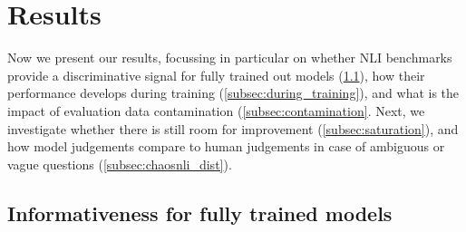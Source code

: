 \section{Results}

Now we present our results, focussing in particular on whether NLI benchmarks provide a discriminative signal for fully trained out models (\cref{subsec:fully_trained}), how their performance develops during training (\cref{subsec:during_training}), and what is the impact of evaluation data contamination (\cref{subsec:contamination}. 
Next, we investigate whether there is still room for improvement (\cref{subsec:saturation}), and how model judgements compare to human judgements in case of ambiguous or vague questions (\cref{subsec:chaosnli_dist}).


\subsection{Informativeness for fully trained models}\label{subsec:fully_trained}

